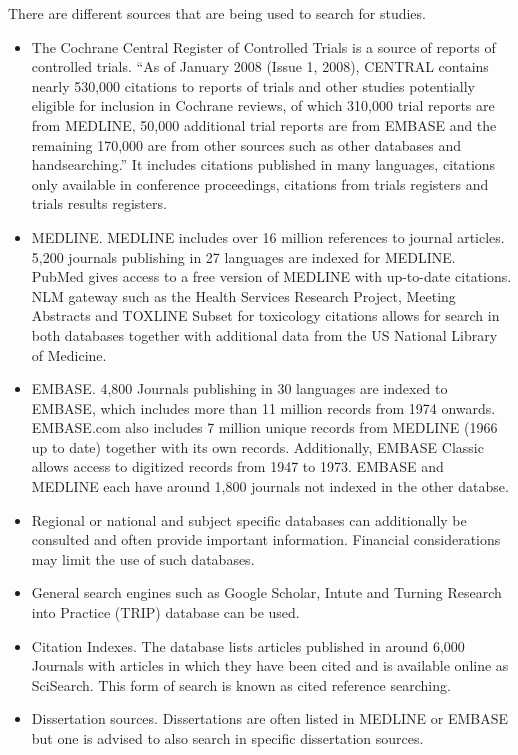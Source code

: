 \documentclass[11pt,a4paper,twoside]{book}\usepackage[]{graphicx}\usepackage[]{color}
\begin{document}
\vspace{0mm}
There are different sources that are being used to search for studies. 
\begin{itemize}
\item The Cochrane Central Register of Controlled Trials is a source of reports of controlled trials. ``As of January 2008 (Issue 1, 2008), CENTRAL contains nearly 530,000 citations to reports of trials and other studies potentially eligible for inclusion in Cochrane reviews, of which 310,000 trial reports are from MEDLINE, 50,000 additional trial reports are from EMBASE and the remaining 170,000 are from other sources such as other databases and handsearching.'' It includes citations published in many languages, citations only available in conference proceedings, citations from trials registers and trials results registers.
\item MEDLINE. MEDLINE includes over 16 million references to journal articles. 5,200 journals publishing in 27 languages are indexed for MEDLINE. PubMed gives access to a free version of MEDLINE with up-to-date citations. NLM gateway such as the Health Services Research Project, Meeting Abstracts and TOXLINE Subset for toxicology citations allows for search in both databases together with additional data from the US National Library of Medicine.
\item EMBASE. 4,800 Journals publishing in 30 languages are indexed to EMBASE, which includes more than 11 million records from 1974 onwards. EMBASE.com also includes 7 million unique records from MEDLINE (1966 up to date) together with its own records. Additionally, EMBASE Classic allows access to digitized records from 1947 to 1973. EMBASE and MEDLINE each have around 1,800 journals not indexed in the other databse.
\item Regional or national and subject specific databases can additionally be consulted and often provide important information. Financial considerations may limit the use of such databases.
\item General search engines such as Google Scholar, Intute and Turning Research into Practice (TRIP) database can be used.
\item Citation Indexes. The database lists articles published in around 6,000 Journals with articles in which they have been cited and is available online as SciSearch. This form of search is known as cited reference searching.
\item Dissertation sources. Dissertations are often listed in MEDLINE or EMBASE but one is advised to also search in specific dissertation sources.

\end{itemize}
\end{document}
